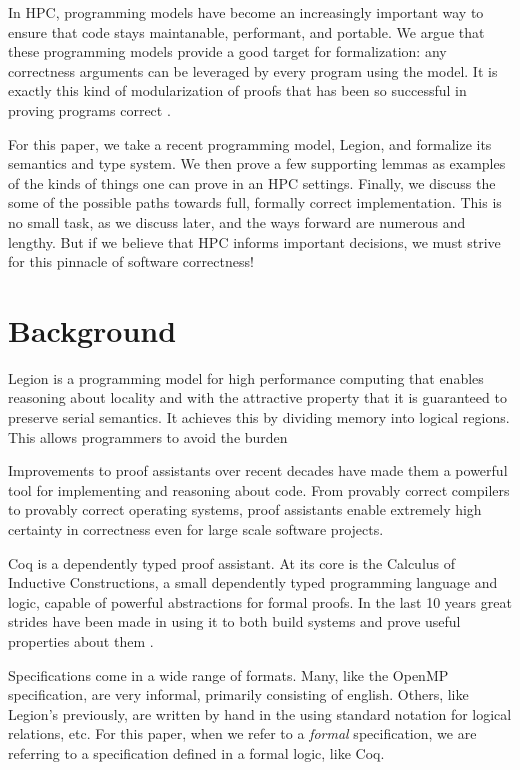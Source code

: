 \documentclass[sigplan]{acmart}
\begin{document}
In HPC, programming models have become an increasingly important way to ensure
that code stays maintanable, performant, and portable. We argue that these
programming models provide a good target for formalization: any correctness
arguments can be leveraged by every program using the model. It is exactly this 
kind of modularization of proofs that has been so successful in proving programs 
correct \cite{?}.

For this paper, we take a recent programming model, Legion, and formalize its
semantics and type system. We then prove a few supporting lemmas as examples of
the kinds of things one can prove in an HPC settings. Finally, we discuss the
some of the possible paths towards full, formally correct implementation. This
is no small task, as we discuss later, and the ways forward are numerous and
lengthy. But if we believe that HPC informs important decisions, we must strive
for this pinnacle of software correctness!

\section{Background}

Legion is a programming model for high performance computing that enables
reasoning about locality and with the attractive property that it is guaranteed
to preserve serial semantics. It achieves this by dividing memory into logical
regions.  This allows programmers to avoid the
burden 

Improvements to proof assistants over recent decades have made them a powerful
tool for implementing and reasoning about code. From provably correct compilers
to provably correct operating systems, proof assistants enable extremely high
certainty in correctness even for large scale software projects. 

Coq is a dependently typed proof assistant. At its core is the Calculus of
Inductive Constructions, a small dependently typed programming language and
logic, capable of powerful abstractions for formal proofs. In the last 10 years 
great strides have been made in using it to both build systems and prove useful
properties about them \cite{compcert, certicoq, chlipala...}. 

Specifications come in a wide range of formats. Many, like the OpenMP
specification, are very informal, primarily consisting of english. Others, like
Legion's previously, are written by hand in the using standard notation for
logical relations, etc. For this paper, when we refer to a \emph{formal}
specification, we are referring to a specification defined in a formal logic,
like Coq. 
\end{document}
